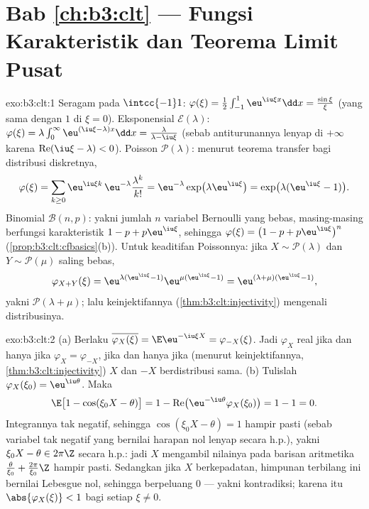 \section*{Bab \ref{ch:b3:clt} --- Fungsi
Karakteristik dan Teorema Limit Pusat}

\begin{solution}{exo:b3:clt:1}
Seragam pada $\intcc{-1}1$: $\varphi(\xi) =
\frac12\int_{-1}^1\eu^{\iu\xi x}\dd x =
\frac{\sin\xi}{\xi}$ (yang sama dengan $1$ di $\xi = 0$).
Eksponensial $\mathcal E(\lambda)$: $\varphi(\xi) =
\lambda\int_0^\infty\eu^{(\iu\xi - \lambda)x}\dd x =
\frac{\lambda}{\lambda - \iu\xi}$ (sebab antiturunannya
lenyap di $+\infty$ karena $\operatorname{Re}(\iu\xi -
\lambda) < 0$). Poisson $\mathcal P(\lambda)$: menurut
teorema transfer bagi distribusi diskretnya,
\[
\varphi(\xi) = \sum_{k\geq0}\eu^{\iu\xi
k}\,\eu^{-\lambda}\frac{\lambda^k}{k!}
= \eu^{-\lambda}\exp\bigl(\lambda\eu^{\iu\xi}\bigr)
= \exp\bigl(\lambda(\eu^{\iu\xi} - 1)\bigr).
\]
Binomial $\mathcal B(n, p)$: yakni jumlah $n$ variabel
Bernoulli yang bebas, masing-masing berfungsi karakteristik $1 - p + p\eu^{\iu\xi}$,
sehingga $\varphi(\xi) = \bigl(1 - p + p\eu^{\iu\xi}\bigr)^n$
(\cref{prop:b3:clt:cfbasics}(b)). Untuk keaditifan Poissonnya: jika $X
\sim \mathcal P(\lambda)$ dan $Y \sim \mathcal P(\mu)$
saling bebas,
\[
\varphi_{X+Y}(\xi) = \eu^{\lambda(\eu^{\iu\xi}-1)}
\eu^{\mu(\eu^{\iu\xi}-1)} =
\eu^{(\lambda+\mu)(\eu^{\iu\xi}-1)},
\]
yakni  $\mathcal P(\lambda + \mu)$; lalu keinjektifannya
(\cref{thm:b3:clt:injectivity}) mengenali distribusinya.
\end{solution}

\begin{solution}{exo:b3:clt:2}
(a) Berlaku $\overline{\varphi_X(\xi)} = \E\eu^{-\iu\xi X} =
\varphi_{-X}(\xi)$. Jadi $\varphi_X$ real jika dan hanya jika
$\varphi_X = \varphi_{-X}$, jika dan hanya jika (menurut keinjektifannya,
\cref{thm:b3:clt:injectivity}) $X$ dan $-X$ berdistribusi
sama.
(b) Tulislah $\varphi_X(\xi_0) = \eu^{\iu\theta}$. Maka
\[
\E\bigl[1 - \cos(\xi_0X - \theta)\bigr]
= 1 - \operatorname{Re}\bigl(\eu^{-\iu\theta}
\varphi_X(\xi_0)\bigr) = 1 - 1 = 0 .
\]
Integrannya tak negatif, sehingga $\cos(\xi_0X - \theta) = 1$
hampir pasti (sebab variabel tak negatif yang bernilai harapan nol
lenyap secara h.p.), yakni $\xi_0X - \theta \in 2\pi\Z$ secara h.p.: jadi $X$
mengambil nilainya pada barisan aritmetika
$\frac{\theta}{\xi_0} + \frac{2\pi}{\xi_0}\Z$ hampir pasti.
Sedangkan jika $X$ berkepadatan, himpunan terbilang ini bernilai Lebesgue nol,
sehingga berpeluang $0$ --- yakni kontradiksi; karena itu
$\abs{\varphi_X(\xi)} < 1$ bagi setiap $\xi \neq 0$.
\end{solution}

